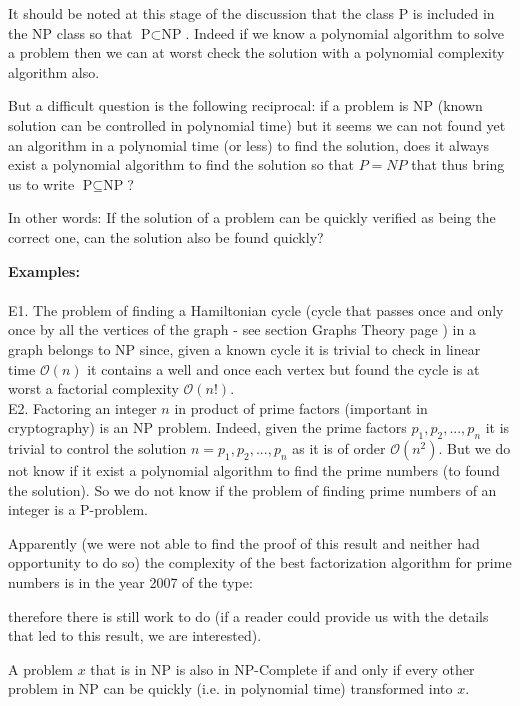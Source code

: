 	It should be noted at this stage of the discussion that the class P is included in the NP class so that $\text{P} \subset \text{NP} $. Indeed if we know a polynomial algorithm to solve a problem then we can at worst check the solution with a polynomial complexity algorithm also.

	But a difficult question is the following reciprocal: if a problem is NP (known solution can be controlled in polynomial time) but it seems we can not found yet an algorithm in a polynomial time (or less) to find the solution, does it always exist a polynomial algorithm to find the solution so that $P=NP$ that thus bring us to write  $\text{P} \subseteq \text{NP}$?
	
	In other words: If the solution of a problem can be quickly verified as being the correct one, can the solution also be found quickly?
	\begin{tcolorbox}[colframe=black,colback=white,sharp corners]
	\textbf{{\Large {}}Examples:}\\\\
	E1. The problem of finding a Hamiltonian cycle (cycle that passes once and only once by all the vertices of the graph - see section Graphs Theory page \pageref{hamiltonian cycle}) in a graph belongs to NP since, given a known cycle it is trivial to check in linear time $\mathcal{O}(n)$ it contains a well and once each vertex but found the cycle is at worst a factorial complexity $\mathcal{O}(n!)$.\\
	
	E2. Factoring an integer $n$ in product of prime factors (important in cryptography) is an NP problem. Indeed, given the prime factors $p_1,p_2,...,p_n$ it is trivial to control the solution $n=p_1,p_2,...,p_n$ as it is of order $\mathcal{O}(n^2)$. But we do not know if it exist a polynomial algorithm to find the prime numbers (to found the solution). So we do not know if the problem of finding prime numbers of an integer is a P-problem.
	\end{tcolorbox}
	
	\begin{tcolorbox}[title=Remark,colframe=black,arc=10pt]
Apparently (we were not able to find the proof of this result and neither had opportunity to do so) the complexity of the best factorization algorithm for prime numbers is in the year 2007 of the type:
	
therefore there is still work to do (if a reader could provide us with the details that led to this result, we are interested).
	\end{tcolorbox}
	A problem $x$ that is in NP is also in NP-Complete if and only if every other problem in NP can be quickly (i.e. in polynomial time) transformed into $x$.

